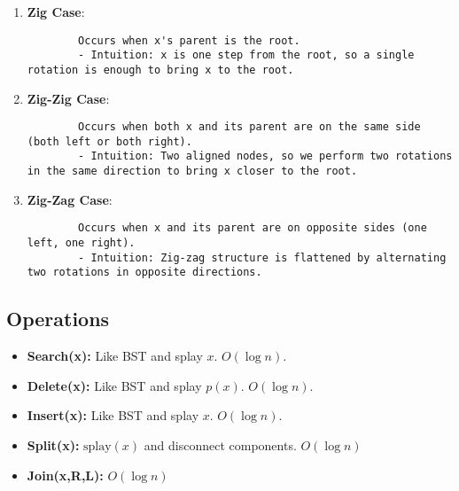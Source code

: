 \begin{intuition}
    \begin{enumerate}
        \item \textbf{Zig Case}: 
        \begin{lstlisting}
        Occurs when x's parent is the root.
        - Intuition: x is one step from the root, so a single rotation is enough to bring x to the root.
        \end{lstlisting}
    
        \item \textbf{Zig-Zig Case}: 
        \begin{lstlisting}
        Occurs when both x and its parent are on the same side (both left or both right).
        - Intuition: Two aligned nodes, so we perform two rotations in the same direction to bring x closer to the root.
        \end{lstlisting}
    
        \item \textbf{Zig-Zag Case}:
        \begin{lstlisting}
        Occurs when x and its parent are on opposite sides (one left, one right).
        - Intuition: Zig-zag structure is flattened by alternating two rotations in opposite directions.
        \end{lstlisting}
        
    \end{enumerate}  
\end{intuition}

\begin{example}
\end{example}

\subsection{Operations}
\begin{definition}
    \begin{itemize}
        \item \textbf{Search(x):} Like BST and splay $x$. $O(\log n)$.
        \item \textbf{Delete(x):} Like BST and splay $p(x)$. $O(\log n)$.
        \item \textbf{Insert(x):} Like BST and splay $x$. $O(\log n)$.
        \item \textbf{Split(x):} $\text{splay}(x)$ and disconnect components. $O(\log n)$
        \item \textbf{Join(x,R,L):} $O(\log n)$
    \end{itemize}
\end{definition}

